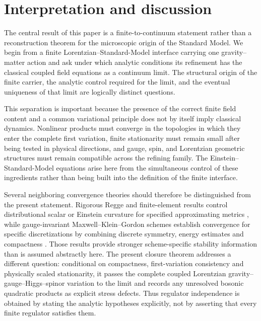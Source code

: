 \documentclass[11pt]{article}
\numberwithin{equation}{section}
\theoremstyle{definition}
\theoremstyle{remark}
\begin{document}
\section{Interpretation and discussion}
\label{sec:discussion}

The central result of this paper is a finite-to-continuum statement rather
than a reconstruction theorem for the microscopic origin of the Standard
Model.  We begin from a finite Lorentzian--Standard-Model interface carrying
one gravity--matter action and ask under which analytic conditions its
refinement has the classical coupled field equations as a continuum limit.
The structural origin of the finite carrier, the analytic control required
for the limit, and the eventual uniqueness of that limit are logically
distinct questions.

This separation is important because the presence of the correct finite
field content and a common variational principle does not by itself imply
classical dynamics.  Nonlinear products must converge in the topologies in
which they enter the complete first variation, finite stationarity must remain
small after being tested in physical directions, and gauge, spin, and
Lorentzian geometric structures must remain compatible across the refining
family.  The Einstein--Standard-Model equations arise here from the
simultaneous control of these ingredients rather than being built into the
definition of the finite interface.

Several neighboring convergence theories should therefore be distinguished
from the present statement.  Rigorous Regge and finite-element results control
distributional scalar or Einstein curvature for specified approximating
metrics \cite{CheegerMullerSchrader1984,ChristiansenRegge2024,
GawlikNeunteufelScalar2025,GawlikNeunteufelEinstein2026}, while
gauge-invariant Maxwell--Klein--Gordon schemes establish convergence for
specific discretizations by combining discrete symmetry, energy estimates and
compactness \cite{ChristiansenHalvorsen2011,
ChristiansenHalvorsenScheid2023}.  Those results provide stronger
scheme-specific stability information than is assumed abstractly here.  The
present closure theorem addresses a different question: conditional on
compactness, first-variation consistency and physically scaled stationarity,
it passes the complete coupled Lorentzian gravity--gauge--Higgs--spinor
variation to the limit and records any unresolved bosonic quadratic products
as explicit stress defects.  Thus regulator independence is obtained by
stating the analytic hypotheses explicitly, not by asserting that every
finite regulator satisfies them.
\end{document}
